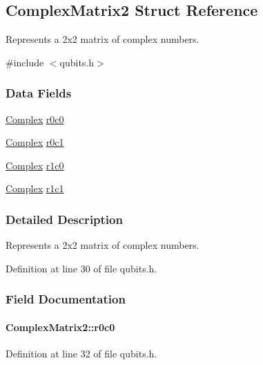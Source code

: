 \hypertarget{structComplexMatrix2}{
\subsection{ComplexMatrix2 Struct Reference}
\label{structComplexMatrix2}
}


Represents a 2x2 matrix of complex numbers.  


{\ttfamily \#include $<$qubits.h$>$}\subsubsection*{Data Fields}
\begin{DoxyCompactItemize}
\item 
\hyperlink{structComplex}{Complex} \hyperlink{structComplexMatrix2_ae72b4458233b077a636beee1892e81ff}{r0c0}
\item 
\hyperlink{structComplex}{Complex} \hyperlink{structComplexMatrix2_a0f3932f055a8b05cef361bce25d51172}{r0c1}
\item 
\hyperlink{structComplex}{Complex} \hyperlink{structComplexMatrix2_ab98282015ed2065e53fbc9638e2583ab}{r1c0}
\item 
\hyperlink{structComplex}{Complex} \hyperlink{structComplexMatrix2_a763007c3070802373549ba0350f83c8a}{r1c1}
\end{DoxyCompactItemize}


\subsubsection{Detailed Description}
Represents a 2x2 matrix of complex numbers. 

Definition at line 30 of file qubits.h.

\subsubsection{Field Documentation}
\hypertarget{structComplexMatrix2_ae72b4458233b077a636beee1892e81ff}{
\paragraph[{r0c0}]{ {\bf ComplexMatrix2::r0c0}}\hfill}
\label{structComplexMatrix2_ae72b4458233b077a636beee1892e81ff}


Definition at line 32 of file qubits.h.

